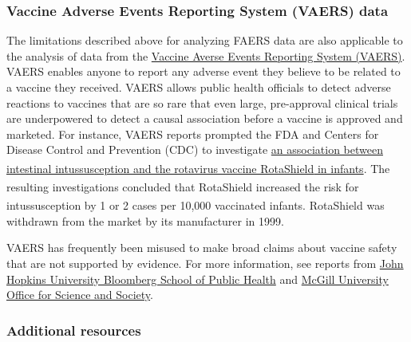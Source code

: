 \documentclass[letterpaper, 12pt]{article}
\begin{document}
\subsubsection*{Vaccine Adverse Events Reporting System (VAERS) data}

The limitations described above for analyzing FAERS data are also applicable to the analysis of data from the \href{https://vaers.hhs.gov/}{Vaccine Averse Events Reporting System (VAERS)}. VAERS enables anyone to report any adverse event they believe to be related to a vaccine they received. VAERS allows public health officials to detect adverse reactions to vaccines that are so rare that even large, pre-approval clinical trials are underpowered to detect a causal association before a vaccine is approved and marketed. For instance, VAERS reports prompted the FDA and Centers for Disease Control and Prevention (CDC) to investigate \href{https://archive.cdc.gov/#/details?url=https://www.cdc.gov/vaccines/vpd-vac/rotavirus/vac-rotashield-historical.htm}{an association between intestinal intussusception and the rotavirus vaccine RotaShield\textsuperscript{\textregistered} in infants}. The resulting investigations concluded that RotaShield\textsuperscript{\textregistered} increased the risk for intussusception by 1 or 2 cases per 10,000 vaccinated infants. RotaShield\textsuperscript{\textregistered} was withdrawn from the market by its manufacturer in 1999.

VAERS has frequently been misused to make broad claims about vaccine safety that are not supported by evidence. For more information, see reports from \href{https://publichealth.jhu.edu/2022/what-vaers-is-and-isnt}{John Hopkins University Bloomberg School of Public Health} and \href{https://www.mcgill.ca/oss/article/covid-19-critical-thinking-health/dont-fall-vaers-scare-tactic}{McGill University Office for Science and Society}.

\subsubsection*{Additional resources}
\end{document}
